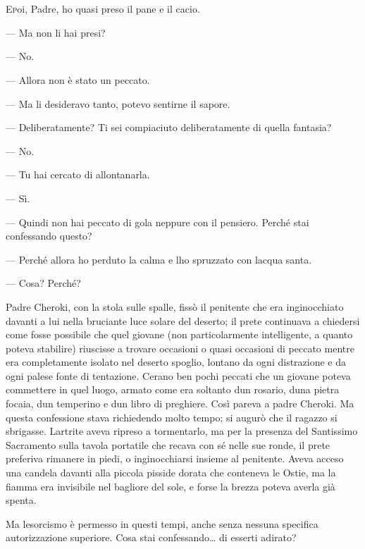 	\chapter{\phantom{text}}

\lettrine[nindent=0em, slope=-.5em, lraise=0.4]{E} poi, Padre, ho quasi preso il pane e il cacio.

--- Ma non li hai presi?

--- No.

--- Allora non è stato un peccato.

--- Ma li desideravo tanto, potevo sentirne il sapore.

--- Deliberatamente? Ti sei compiaciuto deliberatamente di quella
fantasia?

--- No.

--- Tu hai cercato di allontanarla.

--- Sì.

--- Quindi non hai peccato di gola neppure con il pensiero. Perché stai
confessando questo?

--- Perché allora ho perduto la calma e l\textquotesingle ho spruzzato
con l\textquotesingle acqua santa.

--- Cosa? Perché?

Padre Cheroki, con la stola sulle spalle, fissò il penitente che era
inginocchiato davanti a lui nella bruciante luce solare del deserto; il
prete continuava a chiedersi come fosse possibile che quel giovane (non
particolarmente intelligente, a quanto poteva stabilire) riuscisse a
trovare occasioni o quasi occasioni di peccato mentre era completamente
isolato nel deserto spoglio, lontano da ogni distrazione e da ogni
palese fonte di tentazione. C\textquotesingle erano ben pochi peccati
che un giovane poteva commettere in quel luogo, armato come era soltanto
d\textquotesingle un rosario, d\textquotesingle una pietra focaia,
d\textquotesingle un temperino e d\textquotesingle un libro di
preghiere. Così pareva a padre Cheroki. Ma questa confessione stava
richiedendo molto tempo; si augurò che il ragazzo si sbrigasse.
L\textquotesingle artrite aveva ripreso a tormentarlo, ma per la
presenza del Santissimo Sacramento sulla tavola portatile che recava con
sé nelle sue ronde, il prete preferiva rimanere in piedi, o
inginocchiarsi insieme al penitente. Aveva acceso una candela davanti
alla piccola pisside dorata che conteneva le Ostie, ma la fiamma era
invisibile nel bagliore del sole, e forse la brezza poteva averla già
spenta.

Ma l\textquotesingle esorcismo è permesso in questi tempi, anche senza
nessuna specifica autorizzazione superiore. Cosa stai
confessando\ldots{} di esserti adirato?


